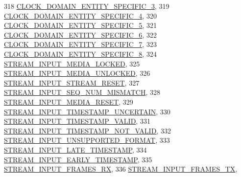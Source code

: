 \begin{DoxyCode}
318     \hyperlink{namespaceavdecc__lib_a831be56dba8ac423258a9374a1202df4a21e239d75886ff1d5094504704845785}{CLOCK\_DOMAIN\_ENTITY\_SPECIFIC\_3},
319     \hyperlink{namespaceavdecc__lib_a831be56dba8ac423258a9374a1202df4a41ba4de7a03f9a7d5fb8a4ff5a519530}{CLOCK\_DOMAIN\_ENTITY\_SPECIFIC\_4},
320     \hyperlink{namespaceavdecc__lib_a831be56dba8ac423258a9374a1202df4a6bf95ed34f57920df3a8a8628ce9ffc1}{CLOCK\_DOMAIN\_ENTITY\_SPECIFIC\_5},
321     \hyperlink{namespaceavdecc__lib_a831be56dba8ac423258a9374a1202df4aaff210ccbc8b4f5b460c9540c3c97b76}{CLOCK\_DOMAIN\_ENTITY\_SPECIFIC\_6},
322     \hyperlink{namespaceavdecc__lib_a831be56dba8ac423258a9374a1202df4acab8a6462afd2377253748adc086ccb7}{CLOCK\_DOMAIN\_ENTITY\_SPECIFIC\_7},
323     \hyperlink{namespaceavdecc__lib_a831be56dba8ac423258a9374a1202df4a71491214afbf31c793925de3f01d9843}{CLOCK\_DOMAIN\_ENTITY\_SPECIFIC\_8},
324     \hyperlink{namespaceavdecc__lib_a831be56dba8ac423258a9374a1202df4a8ca22955ca085351b236a4b2b75652cf}{STREAM\_INPUT\_MEDIA\_LOCKED},
325     \hyperlink{namespaceavdecc__lib_a831be56dba8ac423258a9374a1202df4aef32d9545c5634d3eae3cdfdb932d14b}{STREAM\_INPUT\_MEDIA\_UNLOCKED},
326     \hyperlink{namespaceavdecc__lib_a831be56dba8ac423258a9374a1202df4adeaebf8560ac1735fdd853442d526fea}{STREAM\_INPUT\_STREAM\_RESET},
327     \hyperlink{namespaceavdecc__lib_a831be56dba8ac423258a9374a1202df4a6b7e8a7f845a2e21eab9197698c206e6}{STREAM\_INPUT\_SEQ\_NUM\_MISMATCH},
328     \hyperlink{namespaceavdecc__lib_a831be56dba8ac423258a9374a1202df4aed282fd78c956105ffa934f89f9a4e84}{STREAM\_INPUT\_MEDIA\_RESET},
329     \hyperlink{namespaceavdecc__lib_a831be56dba8ac423258a9374a1202df4ab79637804bbe4db282849e6c285bb916}{STREAM\_INPUT\_TIMESTAMP\_UNCERTAIN},
330     \hyperlink{namespaceavdecc__lib_a831be56dba8ac423258a9374a1202df4a113d279451bf2b134e3b7666f053747f}{STREAM\_INPUT\_TIMESTAMP\_VALID},
331     \hyperlink{namespaceavdecc__lib_a831be56dba8ac423258a9374a1202df4a4ac29b18f9c5e1419921fd202751080c}{STREAM\_INPUT\_TIMESTAMP\_NOT\_VALID},
332     \hyperlink{namespaceavdecc__lib_a831be56dba8ac423258a9374a1202df4a5a8fc53c8728128a42eacecfd7b0b767}{STREAM\_INPUT\_UNSUPPORTED\_FORMAT},
333     \hyperlink{namespaceavdecc__lib_a831be56dba8ac423258a9374a1202df4a5c1b67849a2f0369eacd9cb0a34cd35b}{STREAM\_INPUT\_LATE\_TIMESTAMP},
334     \hyperlink{namespaceavdecc__lib_a831be56dba8ac423258a9374a1202df4a275f10a1321b0f35ad3a85706c9a2992}{STREAM\_INPUT\_EARLY\_TIMESTAMP},
335     \hyperlink{namespaceavdecc__lib_a831be56dba8ac423258a9374a1202df4ab39ecebabdd284a4a76d165ce5ed661d}{STREAM\_INPUT\_FRAMES\_RX},
336     \hyperlink{namespaceavdecc__lib_a831be56dba8ac423258a9374a1202df4a0b0a7b71f908ef6d8bbafd7d9a36ec57}{STREAM\_INPUT\_FRAMES\_TX},

\end{DoxyCode}
